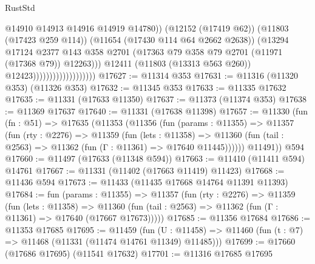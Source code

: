 \begin{lexlean}{RustStd}
\begin{coremodule}
                                                @14910
                                                @14913
                                                @14916
                                                @14919
                                                @14780))
                                            (@12152 (@17419 @62))
                                            (@11803 (@17423 @259 @114))
                                            (@11654 (@17430 @114 @64 @2662 @2638))
                                            (@13294
                                              @17124
                                              @2377
                                              @143
                                              @358
                                              @2701
                                              (@17363
                                                @79
                                                @358
                                                @79
                                                @2701
                                                (@11971 (@17368 @79))
                                                @12263)))
                                          @12411
                                          (@11803 (@13313 @563 @260))
                                          @12423)))))))))))))))))))
@17627 := @11314 @353
@17631 := @11316 (@11320 @353) (@11326 @353)
@17632 := @11345 @353
@17633 := @11335 @17632
@17635 := @11331 (@17633 @11350)
@17637 := @11373 (@11374 @353)
@17638 := @11369 @17637
@17640 := @11331 (@17638 @11398)
@17657 := @11330
    (fun (fn : @51) =>
    @17635
      (@11353
        (@11356
          (fun (params : @11355) =>
          @11357
            (fun (rty : @2276) =>
            @11359
              (fun (lets : @11358) =>
              @11360 (fun (tail : @2563) => @11362 (fun (Γ : @11361) => @17640 @11445))))))
        @11491))
    @594
@17660 := @11497 (@17633 (@11348 @594))
@17663 := @11410 (@11411 @594) @14761
@17667 := @11331 (@11402 (@17663 @11419) @11423)
@17668 := @11436 @594
@17673 := @11433 (@11435 @17668 @14764 @11391 @11393)
@17684 := fun (params : @11355) =>
  @11357
    (fun (rty : @2276) =>
    @11359
      (fun (lets : @11358) =>
      @11360 (fun (tail : @2563) => @11362 (fun (Γ : @11361) => @17640 (@17667 @17673)))))
@17685 := @11356 @17684
@17686 := @11353 @17685
@17695 := @11459
    (fun (U : @11458) => @11460 (fun (t : @7) => @11468 (@11331 (@11474 @14761 @11349) @11485)))
@17699 := @17660 (@17686 @17695) (@11541 @17632)
@17701 := @11316 @17685 @17695

\end{coremodule}
\end{lexlean}
